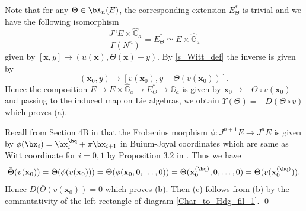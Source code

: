 \documentclass{amsart}
\numberwithin {equation}{section}
\newcommand{\map}{\rightarrow}
\begin{document}
\proof  Note that for any $\Theta \in {\bX}_{n}(E)$, the corresponding extension $E_{\Theta}^{*}$ is trivial and we have the following isomorphism 
$$\dfrac{J^{n}E\times \hat{\mathbb{G}}_{a}}{\Gamma(N^{n})}=E_{\Theta}^{*}\simeq E \times \hat{\mathbb{G}}_{a} $$ given by $[\mathbf{x},y]\mapsto (u(\mathbf{x}),\Theta(\mathbf{x})+y)$. By \eqref{s_Witt_def} the inverse is given by $$(\mathbf{x}_{0},y)\mapsto [v(\mathbf{x}_{0}),y-\Theta(v(\mathbf{x}_{0}))].$$ 
Hence the composition $E\rightarrow E \times \hat{\mathbb{G}}_{a} \rightarrow E_{\Theta}^{*}\rightarrow \hat{\mathbb{G}}_{a}$ is given by $\mathbf{x}_{0}\mapsto -\Theta\circ v(\mathbf{x}_{0})$ and passing to the induced map on Lie algebras, we obtain $\tilde{\Upsilon}(\Theta)=-D(\Theta\circ v)$ which proves (a).\medskip

Recall from Section 4B in \cite{BS b} that the Frobenius morphism $\phi:
J^{n+1}E \map J^nE$ is given by $\phi(\bx_{i})=\bx_{i}^{\hq}+\pi \bx_{i+1}$ 
in Buium-Joyal coordinates which are same as Witt coordinate for $i=0,1$ by Proposition 3.2 in \cite{BS b}. Thus we have $$\bar{\Theta}(v(\mathbf{x}_{0}))=\Theta(\phi(v(\mathbf{x}_{0})))=\Theta(\phi(\mathbf{x}_{0},0,\ldots,0))=\Theta(\mathbf{x}_{0}^{(\hq)},0,\ldots,0)=\Theta(v(\mathbf{x}_{0}^{(\hq)})).$$
Hence $D(\bar{\Theta}(v(\mathbf{x}_{0}))=0$ which proves (b). Then (c) follows from (b) by the commutativity of the left rectangle of diagram \eqref{Char_to_Hdg_fil_1}.
\qed
\end{document}
